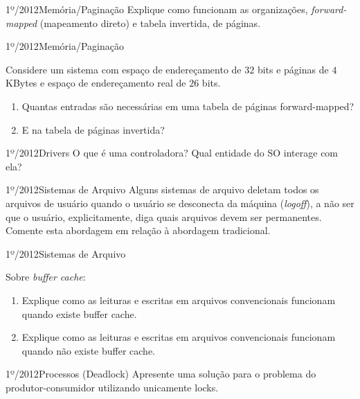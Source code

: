 \begin{exercicio}
  {1º/2012}{Memória/Paginação}
  {Explique como funcionam as organizações, \textit{forward-mapped} (mapeamento direto) e tabela invertida, de páginas.}
\end{exercicio}

\begin{exercicio}
  {1º/2012}{Memória/Paginação}
  {Considere um sistema com espaço de endereçamento de $32$ bits e páginas de $4$KBytes e espaço de endereçamento real de $26$ bits.
  \begin{enumerate}[label=(\alph*)]
    \item Quantas entradas são necessárias em uma tabela de páginas forward-mapped?
    \item E na tabela de páginas invertida?
  \end{enumerate}}
\end{exercicio}

\begin{exercicio}
  {1º/2012}{Drivers}
  {O que é uma controladora? Qual entidade do SO interage com ela?}

\end{exercicio}

\begin{exercicio}
  {1º/2012}{Sistemas de Arquivo}
  {Alguns sistemas de arquivo deletam todos os arquivos de usuário quando o usuário se desconecta da máquina (\textit{logoff}), a não ser que o usuário, explicitamente, diga quais arquivos devem ser permanentes. Comente esta abordagem em relação à abordagem tradicional.}
\end{exercicio}

\begin{exercicio}
  {1º/2012}{Sistemas de Arquivo}
  {Sobre \textit{buffer cache}:
  \begin{enumerate}[label=(\alph*)]
    \item Explique como as leituras e escritas em arquivos convencionais funcionam quando existe buffer cache.
    \item Explique como as leituras e escritas em arquivos convencionais funcionam quando não existe buffer cache.
  \end{enumerate}}
\end{exercicio}

\begin{exercicio}
  {1º/2012}{Processos (Deadlock)}
  {Apresente uma solução para o problema do produtor-consumidor utilizando unicamente locks.}
\end{exercicio}

